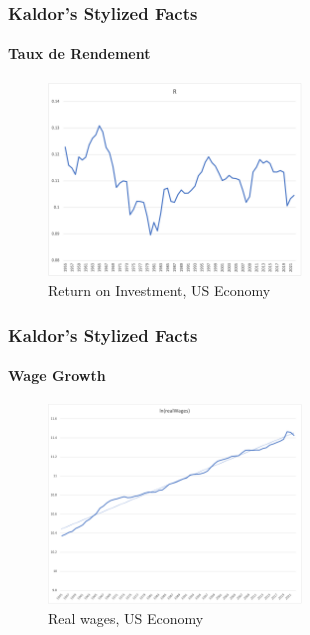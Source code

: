 \documentclass{beamer}
\begin{document}
\begin{frame}
    \frametitle{Kaldor's Stylized Facts}
    \hypertarget{return}{} %
    \framesubtitle{Taux de Rendement}
        \begin{figure}
            \centering
            \includegraphics[width=0.6\textwidth]{graphs/r_usa.png}
            \caption{Return on Investment, US Economy
            \hyperlink{augmented_solow}{}}
        \end{figure}
\end{frame}

\begin{frame}
    \frametitle{Kaldor's Stylized Facts}
    \hypertarget{wages}{} %
    \framesubtitle{Wage Growth}
        \begin{figure}
            \centering
            \includegraphics[width=0.6\textwidth]{graphs/lnwages_usa.png}
            \caption{Real wages, US Economy
            \hyperlink{augmented_solow}{}}

        \end{figure}
\end{frame}

\end{document}
